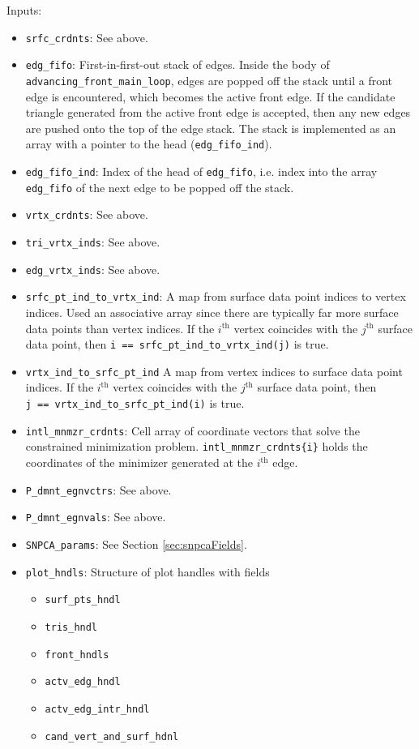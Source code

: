 \documentclass[11pt]{amsart}
\begin{document}
\noindent
Inputs:
\begin{itemize}
\item
\verb+srfc_crdnts+: See above.
\item
\verb+edg_fifo+: First-in-first-out stack of edges. 
Inside the body of \verb+advancing_front_main_loop+, edges are popped off the stack until a front edge is encountered, which becomes the active front edge.
If the candidate triangle generated from the active front edge is accepted, then any new edges are pushed onto the top of the edge stack.
The stack is implemented as an array with a pointer to the head (\verb+edg_fifo_ind+).
\item
\verb+edg_fifo_ind+: Index of the head of \verb+edg_fifo+, i.e. index into the array \verb+edg_fifo+ of the next edge to be popped off the stack.
\item
\verb+vrtx_crdnts+: See above.
\item
\verb+tri_vrtx_inds+: See above.
\item
\verb+edg_vrtx_inds+: See above.
\item
\verb+srfc_pt_ind_to_vrtx_ind+: A map from surface data point indices to vertex indices.
Used an associative array since there are typically far more surface data points than vertex indices.
If the $i^{\text{th}}$ vertex coincides with the $j^{\text{th}}$ surface data point, then 
\verb+i == srfc_pt_ind_to_vrtx_ind(j)+ is true.
\item
\verb+vrtx_ind_to_srfc_pt_ind+ A map from vertex indices to surface data point indices.
If the $i^{\text{th}}$ vertex coincides with the $j^{\text{th}}$ surface data point, then
\\ 
\verb+j == vrtx_ind_to_srfc_pt_ind(i)+ is true.
\item
\verb+intl_mnmzr_crdnts+: Cell array of coordinate vectors that solve the constrained minimization problem.
\verb+intl_mnmzr_crdnts{i}+ holds the coordinates of the minimizer generated at the $i^{\text{th}}$ edge. 
\item
\verb+P_dmnt_egnvctrs+: See above.
\item
\verb+P_dmnt_egnvals+: See above.
\item
\verb+SNPCA_params+: See Section \ref{sec:snpcaFields}.
\item
\verb+plot_hndls+: Structure of plot handles with fields
\begin{itemize}
\item
\verb+surf_pts_hndl+
\item
\verb+tris_hndl+
\item
\verb+front_hndls+
\item
\verb+actv_edg_hndl+
\item
\verb+actv_edg_intr_hndl+
\item
\verb+cand_vert_and_surf_hdnl+
\end{itemize}
\end{itemize}
\end{document}

